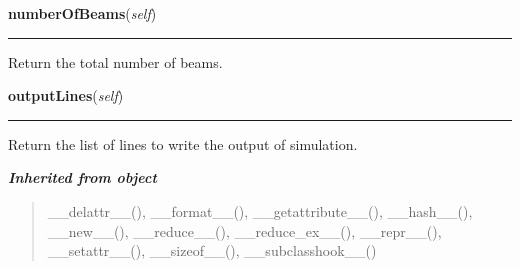     \label{theia:tree:beamtree:BeamTree:numberOfBeams}

    \vspace{0.5ex}

\hspace{.8\funcindent}\begin{boxedminipage}{\funcwidth}

    \raggedright \textbf{numberOfBeams}(\textit{self})

    \vspace{-1.5ex}

    \rule{\textwidth}{0.5\fboxrule}
\setlength{\parskip}{2ex}
    Return the total number of beams.

\setlength{\parskip}{1ex}
    \end{boxedminipage}

    \label{theia:tree:beamtree:BeamTree:outputLines}

    \vspace{0.5ex}

\hspace{.8\funcindent}\begin{boxedminipage}{\funcwidth}

    \raggedright \textbf{outputLines}(\textit{self})

    \vspace{-1.5ex}

    \rule{\textwidth}{0.5\fboxrule}
\setlength{\parskip}{2ex}
    Return the list of lines to write the output of simulation.

\setlength{\parskip}{1ex}
    \end{boxedminipage}


\large{\textbf{\textit{Inherited from object}}}

\begin{quote}
\_\_delattr\_\_(), \_\_format\_\_(), \_\_getattribute\_\_(), \_\_hash\_\_(), \_\_new\_\_(), \_\_reduce\_\_(), \_\_reduce\_ex\_\_(), \_\_repr\_\_(), \_\_setattr\_\_(), \_\_sizeof\_\_(), \_\_subclasshook\_\_()
\end{quote}


